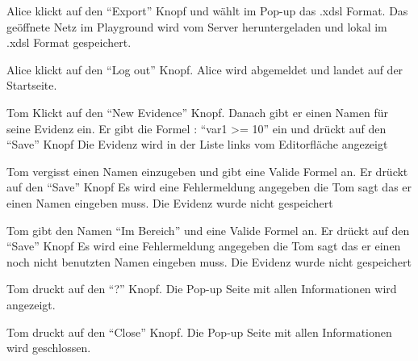 \documentclass[parskip=full,11pt,twoside]{scrartcl}
\begin{document}
{Alice klickt auf den \enquote{Export} Knopf und wählt im Pop-up das .xdsl Format.}
{Das geöffnete Netz im Playground wird vom Server heruntergeladen und lokal im .xdsl Format gespeichert. }

{Alice klickt auf den \enquote{Log out} Knopf.}
{Alice wird abgemeldet und landet auf der Startseite.}




{Tom Klickt auf den \enquote{New Evidence} Knopf. Danach gibt er einen Namen für seine Evidenz ein. Er gibt die Formel : 
\enquote{var1 >= 10} ein und drückt auf den \enquote{Save} Knopf}
{Die Evidenz wird in der Liste links vom Editorfläche angezeigt}

{Tom vergisst einen Namen einzugeben und gibt eine Valide Formel an. Er drückt auf den \enquote{Save} Knopf}
{Es wird eine Fehlermeldung angegeben die Tom sagt das er einen Namen eingeben muss. Die Evidenz wurde nicht gespeichert}

{Tom gibt den Namen \enquote{Im Bereich} und eine Valide Formel an. Er drückt auf den \enquote{Save} Knopf}
{Es wird eine Fehlermeldung angegeben die Tom sagt das er einen noch nicht benutzten Namen eingeben muss. Die Evidenz wurde nicht gespeichert}

{Tom druckt auf den \enquote{?} Knopf.}
{Die Pop-up Seite mit allen Informationen wird angezeigt.}

{Tom druckt auf den \enquote{Close} Knopf.}
{Die Pop-up Seite mit allen Informationen wird geschlossen.}
\end{document}
